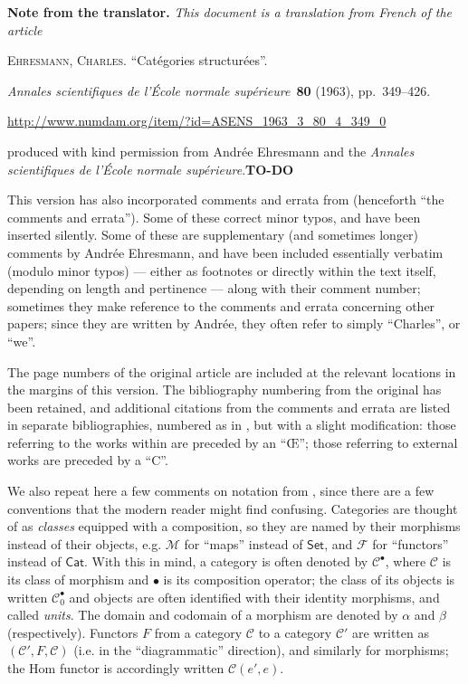 \documentclass[a4paper,fleqn]{article}
\title{\sc{Structured categories}}
\author{Charles Ehresmann}
\date{1963}
\newcommand{\origcit}{%
  \textsc{Ehresmann, Charles.}
  ``Catégories structurées''.
  \par\emph{Annales scientifiques de l'École normale supérieure}~\textbf{80} (1963), pp.~349--426.
  \par\url{http://www.numdam.org/item/?id=ASENS_1963_3_80_4_349_0}
}
\newenvironment{translator}[1]
  {\phantomsection\par\medskip\noindent\small\textbf{#1.}\itshape}
  {\par\medskip}
\theoremstyle{plain}
\theoremstyle{definition}
\newcommand{\todo}{{\color{purple}\textbf{TO-DO }}}
\newcommand{\CC}{\mathcal{C}}
\newcommand{\MM}{\mathcal{M}}
\newcommand{\FF}{\mathcal{F}}
\newcommand{\smallbullet}{\bullet}
\begin{document}
\maketitle

  \begin{translator}{Note from the translator}
    This document is a translation from French of the article

    \medskip
    {\normalfont\origcit}

    \medskip
    {\noindent}produced with kind permission from Andrée Ehresmann and the \emph{Annales scientifiques de l'École normale supérieure}.\todo

    \medskip

    This version has also incorporated comments and errata from \cite[Comments on Part III-1, p.~342--363]{coll} (henceforth ``the comments and errata'').
    Some of these correct minor typos, and have been inserted silently.
    Some of these are supplementary (and sometimes longer) comments by Andrée Ehresmann, and have been included essentially verbatim (modulo minor typos) --- either as footnotes or directly within the text itself, depending on length and pertinence --- along with their comment number;
    sometimes they make reference to the comments and errata concerning other papers;
    since they are written by Andrée, they often refer to simply ``Charles'', or ``we''.

    The page numbers of the original article are included at the relevant locations in the margins of this version.
    The bibliography numbering from the original has been retained, and additional citations from the comments and errata are listed in separate bibliographies, numbered as in \cite{coll}, but with a slight modification: those referring to the works within \cite{coll} are preceded by an ``Œ''; those referring to external works are preceded by a ``C''.

    \medskip

    We also repeat here a few comments on notation from \cite[Comments on Part III-1, p.~337--338]{coll}, since there are a few conventions that the modern reader might find confusing.
    Categories are thought of as \emph{classes} equipped with a composition, so they are named by their morphisms instead of their objects, e.g. $\MM$ for ``maps'' instead of $\mathsf{Set}$, and $\FF$ for ``functors'' instead of $\mathsf{Cat}$.
    With this in mind, a category is often denoted by $\CC^{\smallbullet}$, where $\CC$ is its class of morphism and $\smallbullet$ is its composition operator; the class of its objects is written $\CC_0^\smallbullet$ and objects are often identified with their identity morphisms, and called \emph{units}.
    The domain and codomain of a morphism are denoted by $\alpha$ and $\beta$ (respectively).
    Functors $F$ from a category $\CC$ to a category $\CC'$ are written as $(\CC',F,\CC)$ (i.e. in the ``diagrammatic'' direction), and similarly for morphisms; the Hom functor is accordingly written $\CC(e',e)$.


\end{translator}
\end{document}
